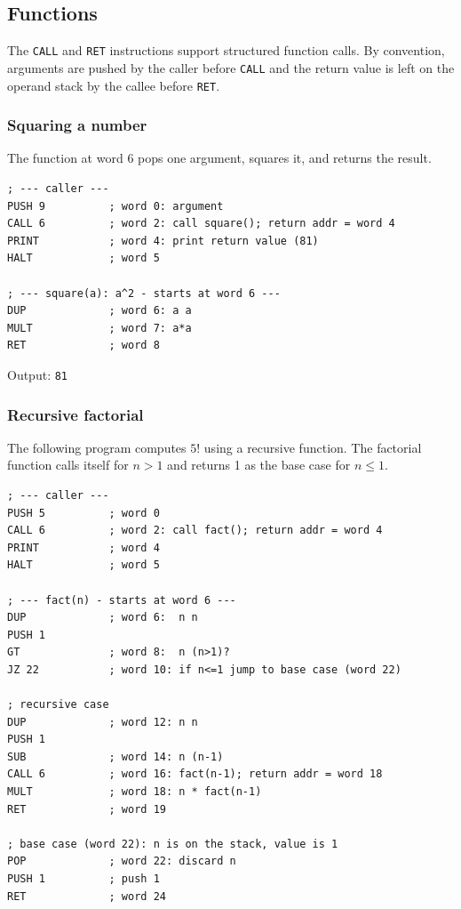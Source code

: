 \subsection{Functions}

The \texttt{CALL} and \texttt{RET} instructions support structured function calls. By convention, arguments are pushed by the caller before \texttt{CALL} and the return value is left on the operand stack by the callee before \texttt{RET}.

\subsubsection*{Squaring a number}

The function at word 6 pops one argument, squares it, and returns the result.

\begin{lstlisting}
; --- caller ---
PUSH 9          ; word 0: argument
CALL 6          ; word 2: call square(); return addr = word 4
PRINT           ; word 4: print return value (81)
HALT            ; word 5

; --- square(a): a^2 - starts at word 6 ---
DUP             ; word 6: a a
MULT            ; word 7: a*a
RET             ; word 8
\end{lstlisting}

Output: \texttt{81}

\subsubsection*{Recursive factorial}

The following program computes $5!$ using a recursive function. The factorial function calls itself for $n > 1$ and returns 1 as the base case for $n \leq 1$.

\begin{lstlisting}
; --- caller ---
PUSH 5          ; word 0
CALL 6          ; word 2: call fact(); return addr = word 4
PRINT           ; word 4
HALT            ; word 5

; --- fact(n) - starts at word 6 ---
DUP             ; word 6:  n n
PUSH 1
GT              ; word 8:  n (n>1)?
JZ 22           ; word 10: if n<=1 jump to base case (word 22)

; recursive case
DUP             ; word 12: n n
PUSH 1
SUB             ; word 14: n (n-1)
CALL 6          ; word 16: fact(n-1); return addr = word 18
MULT            ; word 18: n * fact(n-1)
RET             ; word 19

; base case (word 22): n is on the stack, value is 1
POP             ; word 22: discard n
PUSH 1          ; push 1
RET             ; word 24
\end{lstlisting}

